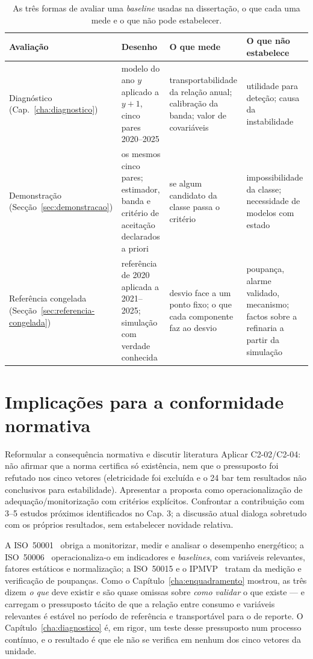 \begin{table}[htbp]
  \centering
  \caption[Os três estimandos deste capítulo]{As três formas de avaliar uma
  \emph{baseline} usadas na dissertação, o que cada uma mede e o que não
  pode estabelecer.}
  \label{tab:estimandos}
  \small
  \begin{tabular}{p{3.0cm}p{3.6cm}p{3.6cm}p{3.4cm}}
    \toprule
    Avaliação & Desenho & O que mede & O que não estabelece \\
    \midrule
    Diagnóstico (Cap.~\ref{cha:diagnostico}) & modelo do ano $y$ aplicado a $y{+}1$, cinco pares 2020--2025 & transportabilidade da relação anual; calibração da banda; valor de covariáveis & utilidade para deteção; causa da instabilidade \\
    Demonstração (Secção~\ref{sec:demonstracao}) & os mesmos cinco pares; estimador, banda e critério de aceitação declarados a priori & se algum candidato da classe passa o critério & impossibilidade da classe; necessidade de modelos com estado \\
    Referência congelada (Secção~\ref{sec:referencia-congelada}) & referência de 2020 aplicada a 2021--2025; simulação com verdade conhecida & desvio face a um ponto fixo; o que cada componente faz ao desvio & poupança, alarme validado, mecanismo; factos sobre a refinaria a partir da simulação \\
    \bottomrule
  \end{tabular}
\end{table}

\section{Implicações para a conformidade normativa}
\label{sec:implicacoes-normativas}
{Reformular a consequência normativa e discutir literatura}
{Aplicar C2-02/C2-04: não afirmar que a norma certifica só existência,
nem que o pressuposto foi refutado nos cinco vetores (eletricidade foi
excluída e o 24 bar tem resultados não conclusivos para estabilidade).
Apresentar a proposta como operacionalização de adequação/monitorização
com critérios explícitos. Confrontar a contribuição com 3--5 estudos
próximos identificados no Cap. 3; a discussão atual dialoga sobretudo
com os próprios resultados, sem estabelecer novidade relativa.}%

A ISO~50001~\cite{ISO50001_2018} obriga a monitorizar, medir e analisar o
desempenho energético; a ISO~50006~\cite{ISO50006_2014} operacionaliza-o em
indicadores e \emph{baselines}, com variáveis relevantes, fatores estáticos
e normalização; a ISO~50015 e o IPMVP~\cite{ISO50015_2014,IPMVP_2022} tratam
da medição e verificação de poupanças. Como o Capítulo~\ref{cha:enquadramento}
mostrou, as três dizem \emph{o que} deve existir e são quase omissas sobre
\emph{como validar} o que existe --- e carregam o pressuposto tácito de que a
relação entre consumo e variáveis relevantes é estável no período de
referência e transportável para o de reporte. O Capítulo~\ref{cha:diagnostico}
é, em rigor, um teste desse pressuposto num processo contínuo, e o resultado
é que ele não se verifica em nenhum dos cinco vetores da unidade.

